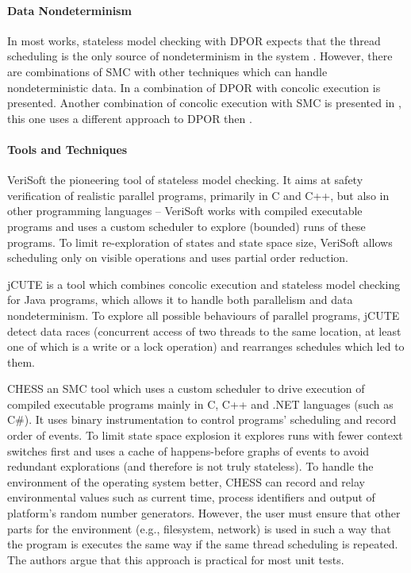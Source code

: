 
\paragraph{Data Nondeterminism}

In most works, stateless model checking with DPOR expects that the thread
scheduling is the only source of nondeterminism in the system .
However, there are combinations of SMC with other techniques which can handle
nondeterministic data.
In  a combination of DPOR with concolic execution is presented.
Another combination of concolic execution with SMC is presented in , this one uses a different approach to DPOR then .

\paragraph{Tools and Techniques}

VeriSoft  the pioneering tool of stateless model checking.
It aims at safety verification of realistic parallel programs, primarily in C and C++, but also in other programming languages -- VeriSoft works with compiled executable programs and uses a custom scheduler to explore (bounded) runs of these programs.
To limit re-exploration of states and state space size, VeriSoft allows scheduling only on visible operations and uses partial order reduction.

jCUTE  is a tool which combines concolic execution and stateless model checking for Java programs, which allows it to handle both parallelism and data nondeterminism.
To explore all possible behaviours of parallel programs, jCUTE detect data races (concurrent access of two threads to the same location, at least one of which is a write or a lock operation) and rearranges schedules which led to them.

CHESS  an SMC tool which uses a custom scheduler to drive execution of compiled executable programs mainly in C, C++ and .NET languages (such as C\#).
It uses binary instrumentation to control programs' scheduling and record order of events.
To limit state space explosion it explores runs with fewer context switches first and uses a cache of happens-before graphs of events to avoid redundant explorations (and therefore is not truly stateless).
To handle the environment of the operating system better, CHESS can record and relay environmental values such as current time, process identifiers and output of platform's random number generators.
However, the user must ensure that other parts for the environment (e.g., filesystem, network) is used in such a way that the program is executes the same way if the same thread scheduling is repeated.
The authors argue that this approach is practical for most unit tests.

